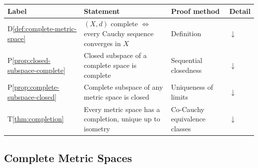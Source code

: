 %


\begin{tcolorbox}[colback=gray!6, colframe=gray!40, arc=2pt,
  left=6pt, right=6pt, top=4pt, bottom=4pt,
  title={\small\textbf{Completeness --- Quick Reference}},
  fonttitle=\small\bfseries]
\small
\begin{tabular}{l l l l}
\toprule
\textbf{Label} & \textbf{Statement} & \textbf{Proof method} & \textbf{Detail} \\
\midrule
D\ref{def:complete-metric-space}
  & $(X,d)$ complete $\iff$ every Cauchy sequence converges in $X$
  & Definition
  & \hyperref[def:complete-metric-space]{$\downarrow$} \\[4pt]
P\ref{prop:closed-subspace-complete}
  & Closed subspace of a complete space is complete
  & Sequential closedness
  & \hyperref[prop:closed-subspace-complete]{$\downarrow$} \\[4pt]
P\ref{prop:complete-subspace-closed}
  & Complete subspace of any metric space is closed
  & Uniqueness of limits
  & \hyperref[prop:complete-subspace-closed]{$\downarrow$} \\[4pt]
T\ref{thm:completion}
  & Every metric space has a completion, unique up to isometry
  & Co-Cauchy equivalence classes
  & \hyperref[thm:completion]{$\downarrow$} \\[4pt]
\bottomrule
\end{tabular}
\end{tcolorbox}

\subsection{Complete Metric Spaces}
\label{sec:complete-metric-spaces}

